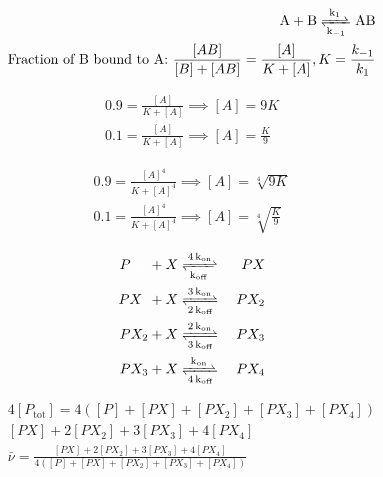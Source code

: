 \documentclass{article}
\begin{document}
\large

\begin{eqnarray*}
\ce{A + B <=>[k_1][k_{-1}]  AB }\\
\textrm{Fraction of B bound to A: } \frac{\left[AB\right]}{\left[B\right] + \left[AB\right]} = \frac{\left[A\right]}{K + \left[A\right]}, K=\frac{k_{-1}}{k_1}
\end{eqnarray*}

\begin{eqnarray*}
0.9 = \frac{\left[A\right]}{K + \left[A\right]} \implies \left[A \right] = 9 K\\
0.1 = \frac{\left[A\right]}{K + \left[A\right]} \implies \left[A \right] = \frac{K}{9}
\end{eqnarray*}

\begin{eqnarray*}
0.9 = \frac{\left[A\right]^4}{K + \left[A\right]^4} \implies \left[A \right] = \sqrt[4]{9 K}\\
0.1 = \frac{\left[A\right]^4}{K + \left[A\right]^4} \implies \left[A \right] = \sqrt[4]{\frac{K}{9}}
\end{eqnarray*}

\begin{eqnarray*}
P {\color{white} X_0} + X & \ce{<=>[4k_{\textrm{on}}][k_{\textrm{off}}] }& PX\\
PX {\color{white} _0} + X &  \ce{<=>[3k_{\textrm{on}}][2k_{\textrm{off}}]} & PX_2 \\
PX_2 + X & \ce{<=>[2k_{\textrm{on}}][3k_{\textrm{off}}] } & PX_3 \\
PX_3 + X & \ce{ <=>[k_{\textrm{on}}][4k_{\textrm{off}}] } & PX_4\\
\end{eqnarray*}

\begin{eqnarray*}
4 \left[P_{\textrm{tot}} \right] = 4 \left( \left[P \right] + \left[PX \right] + \left[PX_2 \right] + \left[PX_3 \right] + \left[PX_4 \right] \right)\\
\left[PX \right] + 2 \left[PX_2 \right] + 3 \left[PX_3 \right] + 4 \left[PX_4 \right]\\
\bar{\nu} = \frac{\left[PX \right] + 2 \left[PX_2 \right] + 3 \left[PX_3 \right] + 4 \left[PX_4 \right]}{4 \left( \left[P \right] + \left[PX \right] + \left[PX_2 \right] + \left[PX_3 \right] + \left[PX_4 \right] \right)}
\end{eqnarray*}
\end{document}
